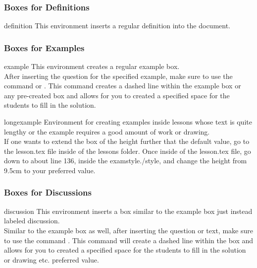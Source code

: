 		\subsubsection{Boxes for Definitions}
			\begin{docEnvironment}{definition}{}
				This environment  inserts a regular definition into the document. 
			\end{docEnvironment}
		\subsubsection{Boxes for Examples}
			\begin{docEnvironment}{example}{}
				This environment  creates a regular example box. \\
				After inserting the question for the specified example, make sure to use the command  or . This command creates a dashed line within the example box or any pre-created box and allows for you to created a specified space for the students to fill in the solution. 
			\end{docEnvironment}
			\begin{docEnvironment}{longexample}{}
				Environment for creating examples inside lessons whose text is quite lengthy or the example requires a good amount of work or drawing. \\
				If one wants to extend the box of the height further that the default value, go to the lesson.tex file inside of the lessons folder. Once inside of the lesson.tex file, go down to about line 136, inside the examstyle./style, and change the height from 9.5cm to your preferred value. 
			\end{docEnvironment}
		\subsubsection{Boxes for Discussions}
			\begin{docEnvironment}{discussion}{}
				This environment inserts a box similar to the example box just instead labeled discussion. \\ 
				Similar to the example box as well, after inserting the question or text, make sure to use the command . This command will create a dashed line within the box and allows for you to created a specified space for the students to fill in the solution or drawing etc. preferred value. 
			\end{docEnvironment}
